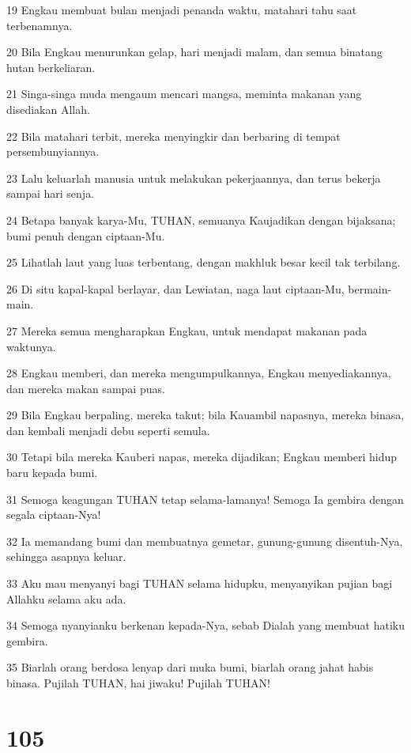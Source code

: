 \par 19 Engkau membuat bulan menjadi penanda waktu, matahari tahu saat terbenamnya.
\par 20 Bila Engkau menurunkan gelap, hari menjadi malam, dan semua binatang hutan berkeliaran.
\par 21 Singa-singa muda mengaum mencari mangsa, meminta makanan yang disediakan Allah.
\par 22 Bila matahari terbit, mereka menyingkir dan berbaring di tempat persembunyiannya.
\par 23 Lalu keluarlah manusia untuk melakukan pekerjaannya, dan terus bekerja sampai hari senja.
\par 24 Betapa banyak karya-Mu, TUHAN, semuanya Kaujadikan dengan bijaksana; bumi penuh dengan ciptaan-Mu.
\par 25 Lihatlah laut yang luas terbentang, dengan makhluk besar kecil tak terbilang.
\par 26 Di situ kapal-kapal berlayar, dan Lewiatan, naga laut ciptaan-Mu, bermain-main.
\par 27 Mereka semua mengharapkan Engkau, untuk mendapat makanan pada waktunya.
\par 28 Engkau memberi, dan mereka mengumpulkannya, Engkau menyediakannya, dan mereka makan sampai puas.
\par 29 Bila Engkau berpaling, mereka takut; bila Kauambil napasnya, mereka binasa, dan kembali menjadi debu seperti semula.
\par 30 Tetapi bila mereka Kauberi napas, mereka dijadikan; Engkau memberi hidup baru kepada bumi.
\par 31 Semoga keagungan TUHAN tetap selama-lamanya! Semoga Ia gembira dengan segala ciptaan-Nya!
\par 32 Ia memandang bumi dan membuatnya gemetar, gunung-gunung disentuh-Nya, sehingga asapnya keluar.
\par 33 Aku mau menyanyi bagi TUHAN selama hidupku, menyanyikan pujian bagi Allahku selama aku ada.
\par 34 Semoga nyanyianku berkenan kepada-Nya, sebab Dialah yang membuat hatiku gembira.
\par 35 Biarlah orang berdosa lenyap dari muka bumi, biarlah orang jahat habis binasa. Pujilah TUHAN, hai jiwaku! Pujilah TUHAN!

\chapter{105}

